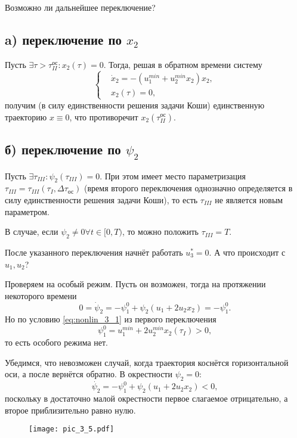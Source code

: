 Возможно ли дальнейшее переключение?

\subsection*{a) переключение по $x_2$}
Пусть $\exists \tau > \tau_{II}^{\text{ос}} \colon x_2(\tau) = 0$. Тогда, решая в обратном времени систему
$$
    \left\{
        \begin{aligned}
            & \dot{x}_2 = - (u_1^{min} + u_2^{min} x_2) x_2, \\
            & x_2(\tau) = 0,
        \end{aligned}
    \right.
$$
получим (в силу единственности решения задачи Коши) единственную траекторию $x \equiv 0$, что противоречит $x_2(\tau_{II}^{\text{ос}})$.

\subsection*{б) переключение по $\psi_2$}
Пусть $\exists \tau_{III} \colon \psi_2(\tau_{III}) = 0$. При этом имеет место параметризация $\tau_{III} = \tau_{III}(\tau_{I}, \Delta \tau_{\text{ос}})$ (время второго переключения однозначно определяется в силу единственности решения задачи Коши), то есть $\tau_{III}$ не является новым параметром.

В случае, если $\psi_2 \neq 0 \forall t \in [0, T)$, то можно положить $\tau_{III} = T$.

После указанного переключения начнёт работать $u_3^* = 0$. А что происходит с $u_1, u_2$?

Проверяем на особый режим. Пусть он возможен, тогда на протяжении некоторого времени 
$$
    0 = \dot{\psi}_2 = - \psi_1^0 + \psi_2 (u_1 + 2 u_2 x_2) = -\psi_1^0.
$$
Но по условию \eqref{eq:nonlin_3_1} из первого переключения
$$
    \psi_1^0 = u_1^{min} + 2 u_2^{min} x_2 (\tau_{I}) > 0,
$$
то есть особого режима нет.

Убедимся, что невозможен случай, когда траектория коснётся горизонтальной оси, а после вернётся обратно. В окрестности $\psi_2 = 0$:
$$
    \dot{\psi_2} = - \psi_1^0 + \psi_2 (u_1 + 2 u_2 x_2) < 0,
$$
поскольку в достаточно малой окрестности первое слагаемое отрицательно, а второе приблизительно равно нулю.

\begin{figure}[H]
    \centering
    \texttt{[image: pic\_3\_5.pdf]}
\end{figure}

